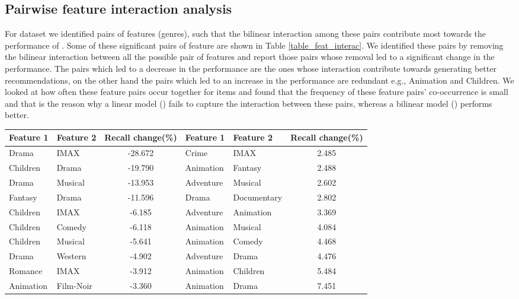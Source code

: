 \subsection{Pairwise feature interaction analysis}
For \MLHR dataset we identified pairs of features (genres), such that the bilinear
interaction among these pairs contribute most towards the performance of \CF.
Some of these significant pairs of feature are shown in Table \ref{table_feat_interac}. We
identified these pairs by removing the bilinear interaction between all the possible
pair of features and report those pairs whose removal led to a significant
change in the performance. The pairs which led to a decrease in
the performance are the ones whose interaction contribute towards generating better
recommendations, on the other hand the pairs which led to an increase in the performance are
redundant e.g., Animation and Children. We looked at how often these feature pairs 
occur together for items and found that the frequency of these feature
pairs' co-occurrence is small and that is the reason why a linear model (\CFLIN) fails to capture
the interaction between these pairs, whereas a bilinear model (\CF) performs better.

\begin{table*}[hbt]%
  \centering
  \caption {Significant feature pairs}
  \label{table_feat_interac}
  \begin{threeparttable}
    \centering
    \begin{tabular}{p{2cm}p{2cm}cp{2cm}p{2cm}c}
      \hline
       \textbf{Feature 1} &
       \textbf{Feature 2} & 
       \textbf{Recall change(\%)} &
       \textbf{Feature 1} &
       \textbf{Feature 2} & 
       \textbf{Recall change(\%)} \\
      \hline
      Drama & IMAX & -28.672& Crime & IMAX & 2.485\\
      Children & Drama & -19.790  & Animation & Fantasy & 2.488\\
      Drama & Musical & -13.953  & Adventure & Musical & 2.602 \\
      Fantasy & Drama & -11.596 & Drama  & Documentary & 2.802 \\
      Children & IMAX & -6.185 & Adventure & Animation & 3.369 \\
      Children & Comedy & -6.118 & Animation & Musical & 4.084  \\
      Children & Musical & -5.641 & Animation & Comedy & 4.468 \\
      Drama & Western & -4.902 & Adventure & Drama & 4.476 \\
      Romance & IMAX & -3.912 & Animation & Children & 5.484 \\
      Animation & Film-Noir & -3.360 & Animation & Drama & 7.451 \\
      \hline
    \end{tabular}
  \end{threeparttable}
\end{table*}


